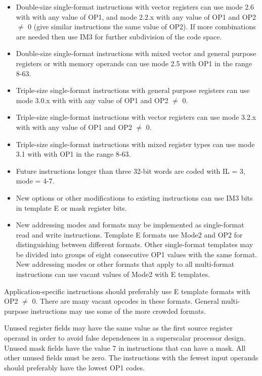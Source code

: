\documentclass[forwardcom.tex]{subfiles}
\begin{document}
\begin{itemize}
\item Double-size single-format instructions with vector registers can use mode 2.6 with with any value of OP1, and mode 2.2.x with any value of OP1 and OP2 $\neq$ 0 (give similar instructions the same value of OP2). If more combinations are needed then use IM3 for further subdivision of the code space.

\item Double-size single-format instructions with mixed vector and general purpose registers or with memory operands can use mode 2.5 with OP1 in the range 8-63.

\item Triple-size single-format instructions with general purpose registers can use mode 3.0.x with with any value of OP1 and OP2 $\neq$ 0.

\item Triple-size single-format instructions with vector registers can use mode 3.2.x with with any value of OP1 and OP2 $\neq$ 0.

\item Triple-size single-format instructions with mixed register types can use mode 3.1 with with OP1 in the range 8-63.


\item Future instructions longer than three 32-bit words are coded with IL = 3, mode = 4-7.

\item New options or other modifications to existing instructions can use IM3 bits in template E or mask register bits.

\item New addressing modes and formats may be implemented as single-format read and write instructions. Template E formats use Mode2 and OP2 for distinguishing between different formats. 
Other single-format templates may be divided into groups of eight consecutive OP1 values with the same format.
New addressing modes or other formats that apply to all multi-format instructions can use vacant values of Mode2 with E templates.

\end{itemize}

Application-specific instructions should preferably use E template formats with OP2 $\neq$ 0. There are many vacant opcodes in these formats. General multi-purpose instructions may use some of the more crowded formats.
\vspace{2mm}

Unused register fields may have the same value as the first source register operand in order to avoid false dependences in a superscalar processor design. Unused mask fields have the value 7 in instructions that can have a mask.
All other unused fields must be zero. The instructions with the fewest input operands should preferably have the lowest OP1 codes. 
\end{document}
